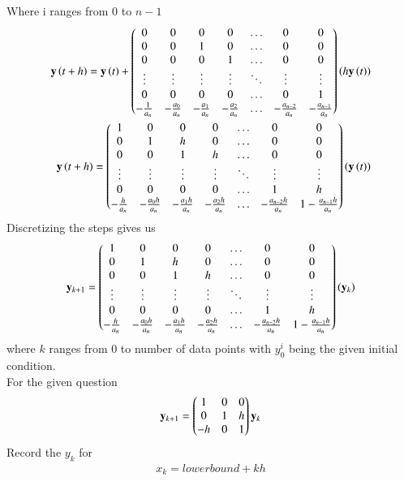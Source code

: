 \documentclass[journal]{IEEEtran}
\begin{document}
Where i ranges from 0 to $n-1$\\
\begin{align}
	\mathbf{y}\left(t+h\right) = \mathbf{y}\left(t\right) + \begin{pmatrix}0 & 0 & 0 & 0 & \dots & 0 & 0\\ 0 & 0 & 1 & 0 & \dots & 0 & 0\\0 & 0 & 0 & 1 & \dots & 0 & 0\\\vdots & \vdots & \vdots & \vdots& \ddots & \vdots & \vdots\\
	0 & 0 & 0 & 0 & \dots & 0 & 1\\-\frac{1}{a_n} & -\frac{a_0}{a_n} & -\frac{a_1}{a_n} & -\frac{a_2}{a_n} & \dots & -\frac{a_{n-2}}{a_n} & -\frac{a_{n-1}}{a_n}\end{pmatrix}\left(h\mathbf{y}\left(t\right)\right)\\
	\mathbf{y}\left(t+h\right) = \begin{pmatrix}1 & 0 & 0 & 0 & \dots & 0 & 0\\ 0 & 1 & h & 0 & \dots & 0 & 0\\0 & 0 & 1 & h & \dots & 0 & 0\\\vdots & \vdots & \vdots & \vdots& \ddots & \vdots & \vdots\\
	0 & 0 & 0 & 0 & \dots & 1 & h\\-\frac{h}{a_n} & -\frac{a_0h}{a_n} & -\frac{a_1h}{a_n} & -\frac{a_2h}{a_n} & \dots & -\frac{a_{n-2}h}{a_n} & 1-\frac{a_{n-1}h}{a_n}\end{pmatrix}\left(\mathbf{y}\left(t\right)\right)
\end{align}
Discretizing the steps gives us
\begin{align}
	\mathbf{y}_{k+1} = \begin{pmatrix}1 & 0 & 0 & 0 & \dots & 0 & 0\\ 0 & 1 & h & 0 & \dots & 0 & 0\\0 & 0 & 1 & h & \dots & 0 & 0\\\vdots & \vdots & \vdots & \vdots& \ddots & \vdots & \vdots\\
	0 & 0 & 0 & 0 & \dots & 1 & h\\-\frac{h}{a_n} & -\frac{a_0h}{a_n} & -\frac{a_1h}{a_n} & -\frac{a_2h}{a_n} & \dots & -\frac{a_{n-2}h}{a_n} & 1-\frac{a_{n-1}h}{a_n}\end{pmatrix}\left(\mathbf{y}_{k}\right)
\end{align}
where $k$ ranges from 0 to number of data points with $y^{i}_0$ being the given initial condition.\\
For the given question\\
\begin{align}
	\mathbf{y}_{k+1} = \begin{pmatrix}1 & 0 & 0\\ 0 & 1 & h\\ -h & 0 & 1\end{pmatrix}\mathbf{y}_k
\end{align}
Record the $y_k$ for 
\begin{align}
x_k =lowerbound+kh
\end{align}
\end{document}
